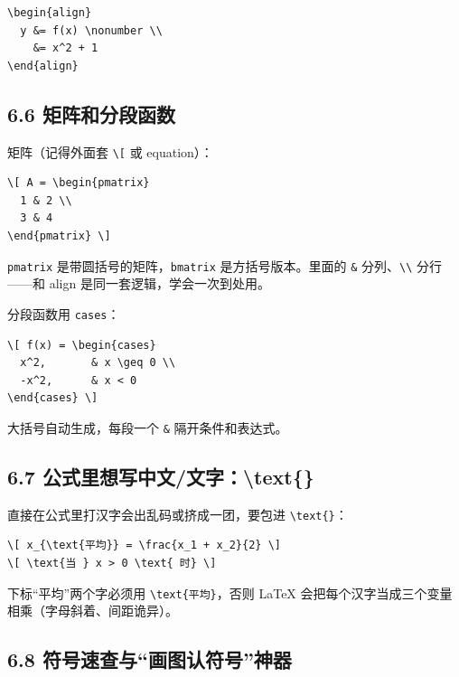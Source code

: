 \begin{lstlisting}
\begin{align}
  y &= f(x) \nonumber \\
    &= x^2 + 1
\end{align}
\end{lstlisting}

\subsection*{6.6 矩阵和分段函数}

矩阵（记得外面套 \texttt{\textbackslash{}[} 或 equation）：

\begin{lstlisting}
\[ A = \begin{pmatrix}
  1 & 2 \\
  3 & 4
\end{pmatrix} \]
\end{lstlisting}

\texttt{pmatrix} 是带圆括号的矩阵，\texttt{bmatrix} 是方括号版本。里面的 \texttt{\&} 分列、\texttt{\textbackslash{}\textbackslash{}} 分行——和 align 是同一套逻辑，学会一次到处用。

分段函数用 \texttt{cases}：

\begin{lstlisting}
\[ f(x) = \begin{cases}
  x^2,       & x \geq 0 \\
  -x^2,      & x < 0
\end{cases} \]
\end{lstlisting}

大括号自动生成，每段一个 \texttt{\&} 隔开条件和表达式。

\subsection*{6.7 公式里想写中文/文字：\textbackslash{}text\{\}}

直接在公式里打汉字会出乱码或挤成一团，要包进 \texttt{\textbackslash{}text\{\}}：

\begin{lstlisting}
\[ x_{\text{平均}} = \frac{x_1 + x_2}{2} \]
\[ \text{当 } x > 0 \text{ 时} \]
\end{lstlisting}

下标“平均”两个字必须用 \texttt{\textbackslash{}text\{平均\}}，否则 LaTeX 会把每个汉字当成三个变量相乘（字母斜着、间距诡异）。

\subsection*{6.8 符号速查与“画图认符号”神器}


